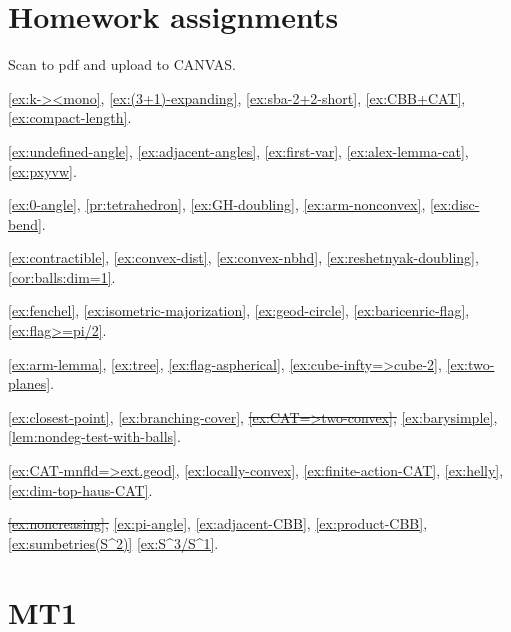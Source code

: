 \chapter*{Homework assignments}

Scan to pdf and upload to CANVAS.

\ref{ex:k-><mono},
\ref{ex:(3+1)-expanding},
\ref{ex:sba-2+2-short},
\ref{ex:CBB+CAT},
\ref{ex:compact-length}.

\ref{ex:undefined-angle},
\ref{ex:adjacent-angles},
\ref{ex:first-var},
\ref{ex:alex-lemma-cat},
\ref{ex:pxyvw}.

\ref{ex:0-angle},
\ref{pr:tetrahedron},
\ref{ex:GH-doubling},
\ref{ex:arm-nonconvex},
\ref{ex:disc-bend}.

\ref{ex:contractible},
\ref{ex:convex-dist},
\ref{ex:convex-nbhd},
\ref{ex:reshetnyak-doubling},
\ref{cor:balls:dim=1}.

\ref{ex:fenchel},
\ref{ex:isometric-majorization},
\ref{ex:geod-circle},
\ref{ex:baricenric-flag},
\ref{ex:flag>=pi/2}.

\ref{ex:arm-lemma},
\ref{ex:tree},
\ref{ex:flag-aspherical},
\ref{ex:cube-infty=>cube-2},
\ref{ex:two-planes}.

\ref{ex:closest-point},
\ref{ex:branching-cover},
\sout{\ref{ex:CAT=>two-convex},}
\ref{ex:barysimple},
\ref{lem:nondeg-test-with-balls}.

\ref{ex:CAT-mnfld=>ext.geod},
\ref{ex:locally-convex},
\ref{ex:finite-action-CAT},
\ref{ex:helly},
\ref{ex:dim-top-haus-CAT}.

\sout{\ref{ex:noncreasing},}
\ref{ex:pi-angle},
\ref{ex:adjacent-CBB},
\ref{ex:product-CBB},
\ref{ex:sumbetries(S^2)}
\ref{ex:S^3/S^1}.
\newpage

\chapter*{MT1}

